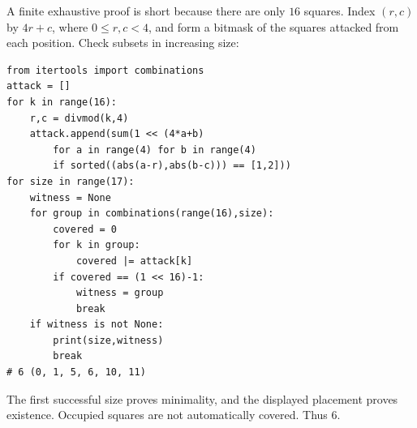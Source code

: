A finite exhaustive proof is short because there are only $16$ squares. Index $(r,c)$ by $4r+c$, where $0\le r,c<4$, and form a bitmask of the squares attacked from each position. Check subsets in increasing size:
\begin{verbatim}
from itertools import combinations
attack = []
for k in range(16):
    r,c = divmod(k,4)
    attack.append(sum(1 << (4*a+b)
        for a in range(4) for b in range(4)
        if sorted((abs(a-r),abs(b-c))) == [1,2]))
for size in range(17):
    witness = None
    for group in combinations(range(16),size):
        covered = 0
        for k in group:
            covered |= attack[k]
        if covered == (1 << 16)-1:
            witness = group
            break
    if witness is not None:
        print(size,witness)
        break
# 6 (0, 1, 5, 6, 10, 11)
\end{verbatim}
The first successful size proves minimality, and the displayed placement proves existence. Occupied squares are not automatically covered. Thus $\boxed6$.
